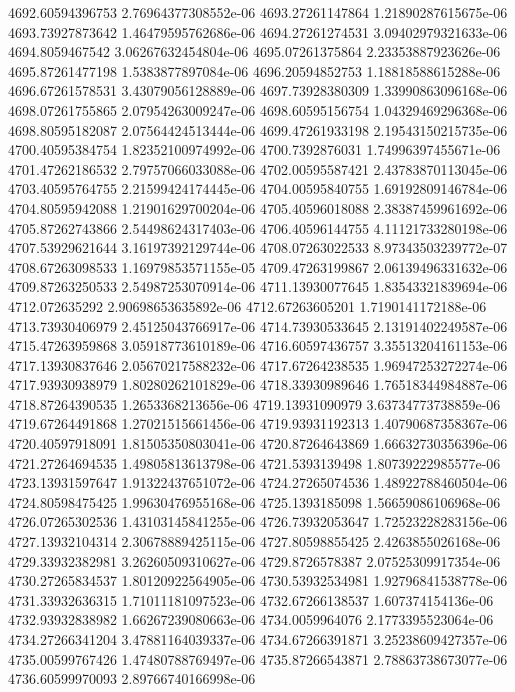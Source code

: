 {4692.60594396753 2.76964377308552e-06
4693.27261147864 1.21890287615675e-06
4693.73927873642 1.46479595762686e-06
4694.27261274531 3.09402979321633e-06
4694.8059467542 3.06267632454804e-06
4695.07261375864 2.23353887923626e-06
4695.87261477198 1.5383877897084e-06
4696.20594852753 1.18818588615288e-06
4696.67261578531 3.43079056128889e-06
4697.73928380309 1.33990863096168e-06
4698.07261755865 2.07954263009247e-06
4698.60595156754 1.04329469296368e-06
4698.80595182087 2.07564424513444e-06
4699.47261933198 2.19543150215735e-06
4700.40595384754 1.82352100974992e-06
4700.7392876031 1.74996397455671e-06
4701.47262186532 2.79757066033088e-06
4702.00595587421 2.43783870113045e-06
4703.40595764755 2.21599424174445e-06
4704.00595840755 1.69192809146784e-06
4704.80595942088 1.21901629700204e-06
4705.40596018088 2.38387459961692e-06
4705.87262743866 2.54498624317403e-06
4706.40596144755 4.11121733280198e-06
4707.53929621644 3.16197392129744e-06
4708.07263022533 8.97343503239772e-07
4708.67263098533 1.16979853571155e-05
4709.47263199867 2.06139496331632e-06
4709.87263250533 2.54987253070914e-06
4711.13930077645 1.83543321839694e-06
4712.072635292 2.90698653635892e-06
4712.67263605201 1.7190141172188e-06
4713.73930406979 2.45125043766917e-06
4714.73930533645 2.13191402249587e-06
4715.47263959868 3.05918773610189e-06
4716.60597436757 3.35513204161153e-06
4717.13930837646 2.05670217588232e-06
4717.67264238535 1.96947253272274e-06
4717.93930938979 1.80280262101829e-06
4718.33930989646 1.76518344984887e-06
4718.87264390535 1.2653368213656e-06
4719.13931090979 3.63734773738859e-06
4719.67264491868 1.27021515661456e-06
4719.93931192313 1.40790687358367e-06
4720.40597918091 1.81505350803041e-06
4720.87264643869 1.66632730356396e-06
4721.27264694535 1.49805813613798e-06
4721.5393139498 1.80739222985577e-06
4723.13931597647 1.91322437651072e-06
4724.27265074536 1.48922788460504e-06
4724.80598475425 1.99630476955168e-06
4725.1393185098 1.56659086106968e-06
4726.07265302536 1.43103145841255e-06
4726.73932053647 1.72523228283156e-06
4727.13932104314 2.30678889425115e-06
4727.80598855425 2.4263855026168e-06
4729.33932382981 3.26260509310627e-06
4729.8726578387 2.07525309917354e-06
4730.27265834537 1.80120922564905e-06
4730.53932534981 1.92796841538778e-06
4731.33932636315 1.71011181097523e-06
4732.67266138537 1.607374154136e-06
4732.93932838982 1.66267239080663e-06
4734.0059964076 2.1773395523064e-06
4734.27266341204 3.47881164039337e-06
4734.67266391871 3.25238609427357e-06
4735.00599767426 1.47480788769497e-06
4735.87266543871 2.78863738673077e-06
4736.60599970093 2.89766740166998e-06
}
